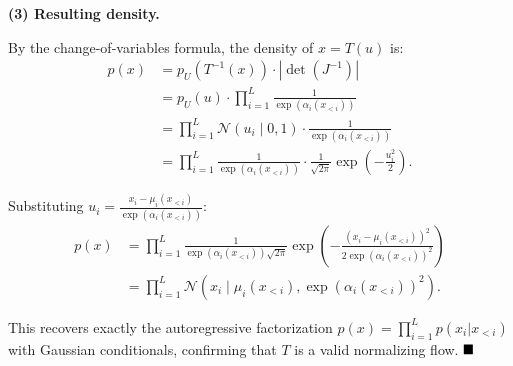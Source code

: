 \documentclass{article}
\begin{document}
{    \textbf{(3) Resulting density.}

    By the change-of-variables formula, the density of $x = T(u)$ is:
    \begin{align}
      p(x) &= p_U(T^{-1}(x)) \cdot |\det(J^{-1})| \nonumber \\
      &= p_U(u) \cdot \prod_{i=1}^{L} \frac{1}{\exp(\alpha_i(x_{<i}))} \nonumber \\
      &= \prod_{i=1}^{L} \mathcal{N}(u_i \mid 0, 1) \cdot \frac{1}{\exp(\alpha_i(x_{<i}))} \nonumber \\
      &= \prod_{i=1}^{L} \frac{1}{\exp(\alpha_i(x_{<i}))} \cdot \frac{1}{\sqrt{2\pi}} \exp\left(-\frac{u_i^2}{2}\right). \nonumber
    \end{align}

    Substituting $u_i = \frac{x_i - \mu_i(x_{<i})}{\exp(\alpha_i(x_{<i}))}$:
    \begin{align}
      p(x) &= \prod_{i=1}^{L} \frac{1}{\exp(\alpha_i(x_{<i})) \sqrt{2\pi}} \exp\left(-\frac{(x_i - \mu_i(x_{<i}))^2}{2\exp(\alpha_i(x_{<i}))^2}\right) \nonumber \\
      &= \prod_{i=1}^{L} \mathcal{N}\left(x_i \mid \mu_i(x_{<i}), \exp(\alpha_i(x_{<i}))^2\right). \nonumber
    \end{align}

    This recovers exactly the autoregressive factorization $p(x) = \prod_{i=1}^{L} p(x_i | x_{<i})$ with Gaussian conditionals, confirming that $T$ is a valid normalizing flow. $\hfill\blacksquare$
}
\end{document}
